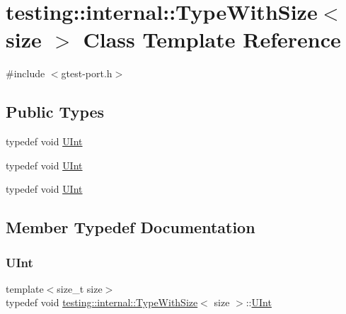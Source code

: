 \hypertarget{classtesting_1_1internal_1_1_type_with_size}{}\section{testing\+::internal\+::Type\+With\+Size$<$ size $>$ Class Template Reference}
\label{classtesting_1_1internal_1_1_type_with_size}


{\ttfamily \#include $<$gtest-\/port.\+h$>$}

\subsection*{Public Types}
\begin{DoxyCompactItemize}
\item 
typedef void \mbox{\hyperlink{classtesting_1_1internal_1_1_type_with_size_a3898640d9f6c1e18110eef90f47a5d7b}{U\+Int}}
\item 
typedef void \mbox{\hyperlink{classtesting_1_1internal_1_1_type_with_size_a3898640d9f6c1e18110eef90f47a5d7b}{U\+Int}}
\item 
typedef void \mbox{\hyperlink{classtesting_1_1internal_1_1_type_with_size_a3898640d9f6c1e18110eef90f47a5d7b}{U\+Int}}
\end{DoxyCompactItemize}


\subsection{Member Typedef Documentation}
\mbox{\label{classtesting_1_1internal_1_1_type_with_size_a3898640d9f6c1e18110eef90f47a5d7b}} 
\subsubsection{\texorpdfstring{UInt}{UInt}\hspace{0.1cm}{\footnotesize\ttfamily [1/3]}}
{\footnotesize\ttfamily template$<$size\+\_\+t size$>$ \\
typedef void \mbox{\hyperlink{classtesting_1_1internal_1_1_type_with_size}{testing\+::internal\+::\+Type\+With\+Size}}$<$ size $>$\+::\mbox{\hyperlink{classtesting_1_1internal_1_1_type_with_size_a3898640d9f6c1e18110eef90f47a5d7b}{U\+Int}}}

